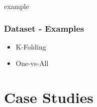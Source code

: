 \documentclass[xcolor=x11names,compress]{beamer}
\begin{document}
\begin{frame}{example}
    \frametitle{Dataset - Examples}

    \begin{itemize}
        \item<1-> K-Folding
        \item<2-> One-vs-All
    \end{itemize}
\end{frame}

\section{Case Studies}
\end{document}
